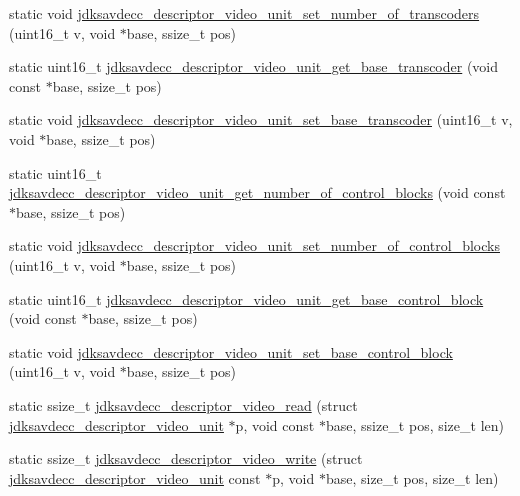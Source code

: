 \begin{DoxyCompactItemize}
\item 
static void \hyperlink{group__descriptor__video_gadd12e6a0e8f16eb286b594c4018a3b0e}{jdksavdecc\+\_\+descriptor\+\_\+video\+\_\+unit\+\_\+set\+\_\+number\+\_\+of\+\_\+transcoders} (uint16\+\_\+t v, void $\ast$base, ssize\+\_\+t pos)
\item 
static uint16\+\_\+t \hyperlink{group__descriptor__video_ga7192f382e3aabcab39de91a422401556}{jdksavdecc\+\_\+descriptor\+\_\+video\+\_\+unit\+\_\+get\+\_\+base\+\_\+transcoder} (void const $\ast$base, ssize\+\_\+t pos)
\item 
static void \hyperlink{group__descriptor__video_ga01723db1c4b8e1abb01f48c5576bf447}{jdksavdecc\+\_\+descriptor\+\_\+video\+\_\+unit\+\_\+set\+\_\+base\+\_\+transcoder} (uint16\+\_\+t v, void $\ast$base, ssize\+\_\+t pos)
\item 
static uint16\+\_\+t \hyperlink{group__descriptor__video_ga799f41ec67f57dd63f001a11d6e02dc0}{jdksavdecc\+\_\+descriptor\+\_\+video\+\_\+unit\+\_\+get\+\_\+number\+\_\+of\+\_\+control\+\_\+blocks} (void const $\ast$base, ssize\+\_\+t pos)
\item 
static void \hyperlink{group__descriptor__video_gaeb8d7f56a16eadfe0f3b4137abbd0d7b}{jdksavdecc\+\_\+descriptor\+\_\+video\+\_\+unit\+\_\+set\+\_\+number\+\_\+of\+\_\+control\+\_\+blocks} (uint16\+\_\+t v, void $\ast$base, ssize\+\_\+t pos)
\item 
static uint16\+\_\+t \hyperlink{group__descriptor__video_gafc1a9610a275d7ba4c434cc62fa9b65b}{jdksavdecc\+\_\+descriptor\+\_\+video\+\_\+unit\+\_\+get\+\_\+base\+\_\+control\+\_\+block} (void const $\ast$base, ssize\+\_\+t pos)
\item 
static void \hyperlink{group__descriptor__video_gab7f7944904ec168753aca5319c3c9dcb}{jdksavdecc\+\_\+descriptor\+\_\+video\+\_\+unit\+\_\+set\+\_\+base\+\_\+control\+\_\+block} (uint16\+\_\+t v, void $\ast$base, ssize\+\_\+t pos)
\item 
static ssize\+\_\+t \hyperlink{group__descriptor__video_ga4e4a693f9c9a72de4a600df91df075d2}{jdksavdecc\+\_\+descriptor\+\_\+video\+\_\+read} (struct \hyperlink{structjdksavdecc__descriptor__video__unit}{jdksavdecc\+\_\+descriptor\+\_\+video\+\_\+unit} $\ast$p, void const $\ast$base, ssize\+\_\+t pos, size\+\_\+t len)
\item 
static ssize\+\_\+t \hyperlink{group__descriptor__video_gae8ef443664911faea85277dfd46bed8e}{jdksavdecc\+\_\+descriptor\+\_\+video\+\_\+write} (struct \hyperlink{structjdksavdecc__descriptor__video__unit}{jdksavdecc\+\_\+descriptor\+\_\+video\+\_\+unit} const $\ast$p, void $\ast$base, size\+\_\+t pos, size\+\_\+t len)
\end{DoxyCompactItemize}


